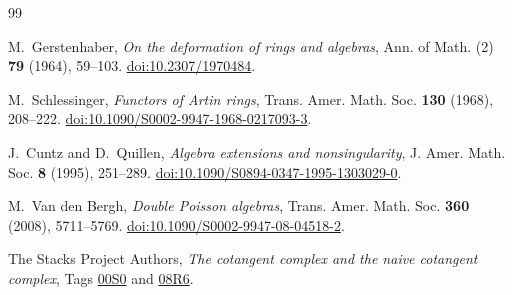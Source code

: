 \documentclass[11pt]{amsart}
\begin{document}
\begin{thebibliography}{99}

M.~Gerstenhaber,
\emph{On the deformation of rings and algebras},
Ann. of Math. (2) \textbf{79} (1964), 59--103.
\href{https://doi.org/10.2307/1970484}{doi:10.2307/1970484}.

M.~Schlessinger,
\emph{Functors of Artin rings},
Trans. Amer. Math. Soc. \textbf{130} (1968), 208--222.
\href{https://doi.org/10.1090/S0002-9947-1968-0217093-3}{doi:10.1090/S0002-9947-1968-0217093-3}.

J.~Cuntz and D.~Quillen,
\emph{Algebra extensions and nonsingularity},
J. Amer. Math. Soc. \textbf{8} (1995), 251--289.
\href{https://doi.org/10.1090/S0894-0347-1995-1303029-0}{doi:10.1090/S0894-0347-1995-1303029-0}.

M.~Van den Bergh,
\emph{Double Poisson algebras},
Trans. Amer. Math. Soc. \textbf{360} (2008), 5711--5769.
\href{https://doi.org/10.1090/S0002-9947-08-04518-2}{doi:10.1090/S0002-9947-08-04518-2}.


The Stacks Project Authors,
\emph{The cotangent complex and the naive cotangent complex},
Tags \href{https://stacks.math.columbia.edu/tag/00S0}{00S0} and
\href{https://stacks.math.columbia.edu/tag/08R6}{08R6}.

\end{thebibliography}
\end{document}
